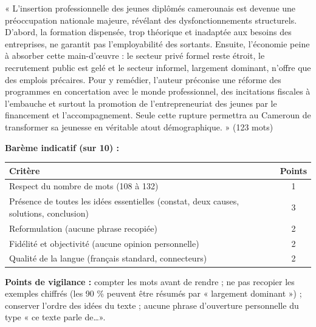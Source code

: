 \documentclass[11pt]{article}
\begin{document}
\begin{corrige}
« L'insertion professionnelle des jeunes diplômés camerounais est devenue une préoccupation nationale majeure, révélant des dysfonctionnements structurels. D'abord, la formation dispensée, trop théorique et inadaptée aux besoins des entreprises, ne garantit pas l'employabilité des sortants. Ensuite, l'économie peine à absorber cette main-d'œuvre : le secteur privé formel reste étroit, le recrutement public est gelé et le secteur informel, largement dominant, n'offre que des emplois précaires. Pour y remédier, l'auteur préconise une réforme des programmes en concertation avec le monde professionnel, des incitations fiscales à l'embauche et surtout la promotion de l'entrepreneuriat des jeunes par le financement et l'accompagnement. Seule cette rupture permettra au Cameroun de transformer sa jeunesse en véritable atout démographique. » (123 mots)

\textbf{Barème indicatif (sur 10) :}
\begin{center}
\begin{tabularx}{\linewidth}{|X|c|}
\hline
\rowcolor{popblueL} \textbf{Critère} & \textbf{Points} \\
\hline
Respect du nombre de mots (108 à 132) & 1 \\
\hline
Présence de toutes les idées essentielles (constat, deux causes, solutions, conclusion) & 3 \\
\hline
Reformulation (aucune phrase recopiée) & 2 \\
\hline
Fidélité et objectivité (aucune opinion personnelle) & 2 \\
\hline
Qualité de la langue (français standard, connecteurs) & 2 \\
\hline
\end{tabularx}
\end{center}

\textbf{Points de vigilance :} compter les mots avant de rendre ; ne pas recopier les exemples chiffrés (les 90 \% peuvent être résumés par « largement dominant ») ; conserver l'ordre des idées du texte ; aucune phrase d'ouverture personnelle du type « ce texte parle de\ldots ».
\end{corrige}
\end{document}
